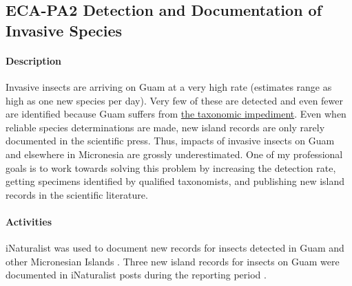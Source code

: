 \subsection{ECA-PA2 Detection and Documentation of Invasive Species}
\begin{refsection}

\paragraph{Description}
Invasive insects are arriving on Guam at a very high rate (estimates
range as high as one new species per day). Very few of these are detected
and even fewer are identified because Guam suffers from \href{https://en.wikipedia.org/wiki/Taxonomic_impediment}{the taxonomic impediment}.
Even when reliable species determinations are made, new island records
are only rarely documented in the scientific press. Thus, impacts
of invasive insects on Guam and elsewhere in Micronesia are grossly
underestimated. One of my professional goals is to work towards solving
this problem by increasing the detection rate, getting specimens identified
by qualified taxonomists, and publishing new island records in the
scientific literature.

\paragraph{Activities}
iNaturalist was used to document new records for insects detected in Guam and other Micronesian Islands \cite{inatSearchForNew}. 
Three new island records for insects on Guam were documented in iNaturalist posts during the reporting period \cite{inatAleurocanthus_woglumi, inatEncarsia_noyesi, inatConotelus_mexicanus}.

\end{refsection}
